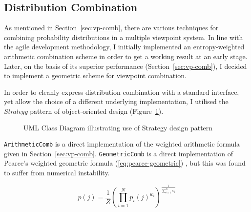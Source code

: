 \documentclass[12pt,a4paper,twoside,openright]{report}
\begin{document}
\subsection{Distribution Combination}

As mentioned in Section~\ref{sec:vp-comb}, there are various techniques for
combining probability distributions in a multiple viewpoint system. In line with
the agile development methodology, I initially implemented an entropy-weighted
arithmetic combination scheme in order to get a working result at an early
stage. Later, on the basis of its superior performance
(Section~\ref{sec:vp-comb}), I decided to implement a geometric scheme for
viewpoint combination.  

In order to cleanly express distribution combination with a standard interface,
yet allow the choice of a different underlying implementation, I utilised the
\emph{Strategy} pattern of object-oriented design
(Figure~\ref{fig:dist-strategy-uml}).

\begin{figure}[H]
\centering
\caption{UML Class Diagram illustrating use of Strategy design pattern}
\label{fig:dist-strategy-uml}
\end{figure}

\texttt{ArithmeticComb} is a direct implementation of the weighted arithmetic
formula given in Section~\ref{sec:vp-comb}. \texttt{GeometricComb} is a direct
implementation of Pearce's weighted geometric formula
(\ref{eq:pearce-geometric}) , but this was found to suffer from numerical
instability. 

\begin{equation}
p(j) = \frac{1}{Z} \left( \prod_{i = 1}^N p_i(j)^{w_i} \right)^{ \frac{1}{
\sum_{i = 1}^N w_i }} \label{eq:pearce-geometric}
\end{equation}
\end{document}
